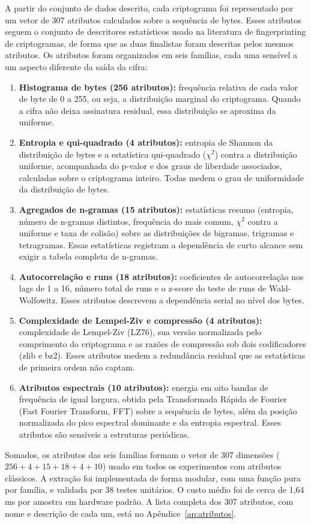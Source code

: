 A partir do conjunto de dados descrito, cada criptograma
foi representado por um vetor de 307 atributos calculados sobre a sequência de
bytes. Esses atributos seguem o conjunto de descritores estatísticos usado na
literatura de fingerprinting de criptogramas, de forma que as duas finalistas
foram descritas pelos mesmos atributos. Os atributos foram organizados em seis
famílias, cada uma sensível a um aspecto diferente da saída da cifra:
\begin{enumerate}
    \item \textbf{Histograma de bytes (256 atributos):} frequência relativa de
    cada valor de byte de 0 a 255, ou seja, a distribuição marginal do criptograma.
    Quando a cifra não deixa assinatura residual, essa distribuição se aproxima da
    uniforme.
    \item \textbf{Entropia e qui-quadrado (4 atributos):} entropia de Shannon da
    distribuição de bytes e a estatística qui-quadrado ($\chi^2$) contra a
    distribuição uniforme, acompanhada do p-valor e dos graus de liberdade
    associados, calculadas sobre o criptograma inteiro. Todas medem o grau
    de uniformidade da distribuição de bytes.
    \item \textbf{Agregados de n-gramas (15 atributos):} estatísticas resumo
    (entropia, número de n-gramas distintos, frequência do mais comum, $\chi^2$
    contra a uniforme e taxa de colisão) sobre as distribuições de bigramas,
    trigramas e tetragramas. Essas estatísticas registram a dependência de curto
    alcance sem exigir a tabela completa de n-gramas.
    \item \textbf{Autocorrelação e runs (18 atributos):} coeficientes de
    autocorrelação nos lags de 1 a 16, número total de runs e o z-score do
    teste de runs de Wald-Wolfowitz. Esses atributos descrevem a dependência serial no
    nível dos bytes.
    \item \textbf{Complexidade de Lempel-Ziv e compressão (4 atributos):}
    complexidade de Lempel-Ziv (LZ76), sua versão normalizada pelo comprimento do
    criptograma e as razões de compressão sob dois codificadores (zlib e bz2). Esses
    atributos medem a redundância residual que as estatísticas de primeira ordem não
    captam.
    \item \textbf{Atributos espectrais (10 atributos):} energia em oito bandas de
    frequência de igual largura, obtida pela Transformada Rápida de Fourier
    (Fast Fourier Transform, FFT) sobre a sequência de bytes, além da posição
    normalizada do pico espectral dominante e da entropia espectral. Esses atributos
    são sensíveis a estruturas periódicas.
\end{enumerate}
Somados, os atributos das seis famílias formam o vetor de 307 dimensões
($256 + 4 + 15 + 18 + 4 + 10$) usado em todos os experimentos com atributos
clássicos. A extração foi implementada de forma modular, com uma função pura por
família, e validada por 38 testes unitários. O custo médio foi de cerca de
1,64\,ms por amostra em hardware padrão. A lista completa dos 307 atributos, com
nome e descrição de cada um, está no Apêndice~\ref{ap:atributos}.




